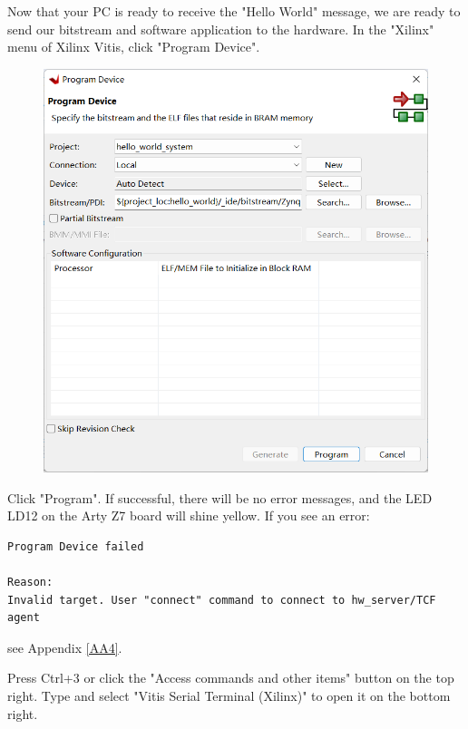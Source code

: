 \documentclass[a4paper,12pt,twoside]{article}
\begin{document}
Now that your PC is ready to receive the "Hello World" message, we are ready to send our bitstream and software application to the hardware. In the "Xilinx" menu of Xilinx Vitis, click "Program Device".
\begin{figure}[H]
    \centering
    \includegraphics[width=\textwidth]{images/15.png}
\end{figure}
Click "Program". If successful, there will be no error messages, and the LED LD12 on the Arty Z7 board will shine yellow. If you see an error:
\begin{verbatim}
Program Device failed

Reason:
Invalid target. User "connect" command to connect to hw_server/TCF agent
\end{verbatim}
see Appendix \ref{AA4}.

Press Ctrl+3 or click the "Access commands and other items" button on the top right. Type and select "Vitis Serial Terminal (Xilinx)" to open it on the bottom right.
\end{document}
